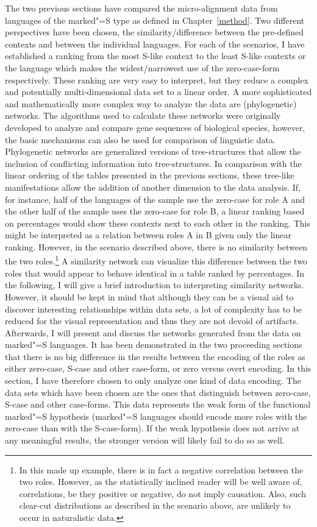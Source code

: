 The two previous sections have compared the micro-alignment data from languages of the marked"=S type as defined in Chapter~\ref{method}.
Two different perspectives have been chosen, the similarity/difference between the pre-defined contexts and between the individual languages. 
For each of the scenarios, I have established a ranking from the most S-like context to the least S-like contexts or the language which makes the widest/narrowest use of the zero-case-form respectively.
These ranking are very easy to interpret, but they reduce a complex and potentially multi-dimensional data set to a linear order.
A more sophisticated and mathematically more complex way to analyze the data are (phylogenetic) networks.
The algorithms used to calculate these networks were originally developed to analyze and compare gene sequences of biological species, however, the basic mechanisms can also be used for comparison of linguistic data. 
Phylogenetic networks are generalized versions of tree-structures that allow the inclusion of conflicting information into tree-structures.
In comparison with the linear ordering of the tables presented in the previous sections, these tree-like manifestations allow the addition of another dimension to the data analysis.
If, for instance, half of the languages of the sample use the zero-case for role A and the other half of the sample uses the zero-case for role B, a linear ranking based on percentages would show these contexts next to each other in the ranking. 
This might be interpreted as a relation between roles A in B given only the linear ranking. 
However, in the scenario described above, there is no similarity between the two roles.\footnote{In this made up example, there is in fact a negative correlation between the two roles. However, as the statistically inclined reader will be well aware of, correlations, be they positive or negative, do not imply causation. 
Also, such clear-cut distributions as described in the scenario above, are unlikely to occur in naturalistic data.} 
A similarity network can visualize this difference between the two roles that would appear to behave identical in a table ranked by percentages.
In the following, I will give a brief introduction to interpreting similarity networks. 
However, it should be kept in mind that although they can be a visual aid to discover interesting relationships within data sets, a lot of complexity has to be reduced for the visual representation and thus they are not devoid of artifacts.  
Afterwards, I will present and discuss the networks generated from the data on marked"=S languages. 
It has been demonstrated in the two proceeding sections that there is no big difference in the results between the encoding of the roles as either zero-case, S-case and other case-form, or zero versus overt encoding. 
In this section, I have therefore chosen to only analyze one kind of data encoding. 
The data sets which have been chosen are the ones that distinguish between zero-case, S-case and other case-forms. 
This data represents the weak form of the functional marked"=S hypothesis (marked"=S languages should encode more roles with the zero-case than with the S-case-form). 
If the weak hypothesis does not arrive at any meaningful results, the stronger version will likely fail to do so as well. 

